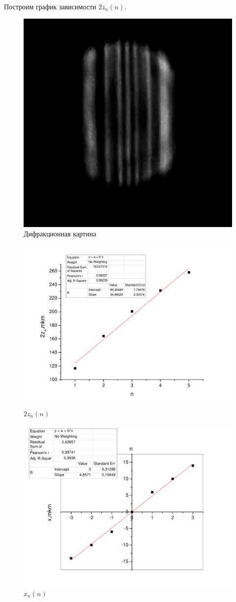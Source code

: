 \documentclass[a4paper,12pt]{article}
\begin{document}
		Построим график зависимости $2z_n(n)$.
		
		\begin{figure}[h!]
			\label{pfren}
			\includegraphics[width = 0.5\linewidth]{fr}
			\centering
			\caption{Дифракционная картина}
		\end{figure}
		
		\begin{figure}[h!]
			\label{gfren}
			\includegraphics[width = 0.85\linewidth]{gfren}
			\centering
			\caption{$2z_n(n)$}
		\end{figure}
		
		\begin{figure}[h!]
			\label{gfraun}
			\includegraphics[width = 0.85\linewidth]{gfraun}
			\centering
			\caption{$x_n(n)$}
		\end{figure}
		
\end{document}

